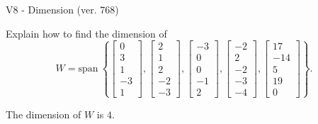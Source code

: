 \begin{exercise}
  \begin{exerciseTitle}V8 - Dimension (ver. 768)\end{exerciseTitle}
  \begin{exerciseStatement}
    Explain how to find the dimension of 
\[W=\mathrm{span}\ \left\{\left[\begin{array}{r}
0 \\
3 \\
1 \\
-3 \\
1
\end{array}\right] , \left[\begin{array}{r}
2 \\
1 \\
2 \\
-2 \\
-3
\end{array}\right] , \left[\begin{array}{r}
-3 \\
0 \\
0 \\
-1 \\
2
\end{array}\right] , \left[\begin{array}{r}
-2 \\
2 \\
-2 \\
-3 \\
-4
\end{array}\right] , \left[\begin{array}{r}
17 \\
-14 \\
5 \\
19 \\
0
\end{array}\right]\right\}.\]



  \end{exerciseStatement}
  \begin{exerciseAnswer}
   The dimension of \(W\) is  \(4\).
  


  \end{exerciseAnswer}
\end{exercise}